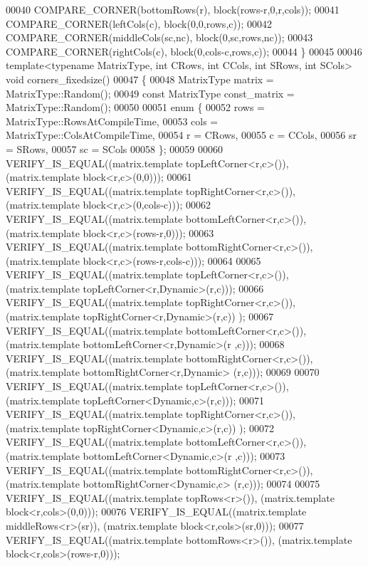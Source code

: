 \begin{DoxyCode}
00040   COMPARE\_CORNER(bottomRows(r), block(rows-r,0,r,cols));
00041   COMPARE\_CORNER(leftCols(c), block(0,0,rows,c));
00042   COMPARE\_CORNER(middleCols(sc,nc), block(0,sc,rows,nc));
00043   COMPARE\_CORNER(rightCols(c), block(0,cols-c,rows,c));
00044 \}
00045 
00046 \textcolor{keyword}{template}<\textcolor{keyword}{typename} MatrixType, \textcolor{keywordtype}{int} CRows, \textcolor{keywordtype}{int} CCols, \textcolor{keywordtype}{int} SRows, \textcolor{keywordtype}{int} SCols> \textcolor{keywordtype}{void} corners\_fixedsize()
00047 \{
00048   MatrixType matrix = MatrixType::Random();
00049   \textcolor{keyword}{const} MatrixType const\_matrix = MatrixType::Random();
00050 
00051   \textcolor{keyword}{enum} \{
00052     rows = MatrixType::RowsAtCompileTime,
00053     cols = MatrixType::ColsAtCompileTime,
00054     r = CRows,
00055     c = CCols,
00056     sr = SRows,
00057     sc = SCols
00058   \};
00059 
00060   VERIFY\_IS\_EQUAL((matrix.template topLeftCorner<r,c>()), (matrix.template block<r,c>(0,0)));
00061   VERIFY\_IS\_EQUAL((matrix.template topRightCorner<r,c>()), (matrix.template block<r,c>(0,cols-c)));
00062   VERIFY\_IS\_EQUAL((matrix.template bottomLeftCorner<r,c>()), (matrix.template block<r,c>(rows-r,0)));
00063   VERIFY\_IS\_EQUAL((matrix.template bottomRightCorner<r,c>()), (matrix.template block<r,c>(rows-r,cols-c)));
00064 
00065   VERIFY\_IS\_EQUAL((matrix.template topLeftCorner<r,c>()), (matrix.template topLeftCorner<r,Dynamic>(r,c)));
00066   VERIFY\_IS\_EQUAL((matrix.template topRightCorner<r,c>()), (matrix.template topRightCorner<r,Dynamic>(r,c))
      );
00067   VERIFY\_IS\_EQUAL((matrix.template bottomLeftCorner<r,c>()), (matrix.template bottomLeftCorner<r,Dynamic>(r
      ,c)));
00068   VERIFY\_IS\_EQUAL((matrix.template bottomRightCorner<r,c>()), (matrix.template bottomRightCorner<r,Dynamic>
      (r,c)));
00069 
00070   VERIFY\_IS\_EQUAL((matrix.template topLeftCorner<r,c>()), (matrix.template topLeftCorner<Dynamic,c>(r,c)));
00071   VERIFY\_IS\_EQUAL((matrix.template topRightCorner<r,c>()), (matrix.template topRightCorner<Dynamic,c>(r,c))
      );
00072   VERIFY\_IS\_EQUAL((matrix.template bottomLeftCorner<r,c>()), (matrix.template bottomLeftCorner<Dynamic,c>(r
      ,c)));
00073   VERIFY\_IS\_EQUAL((matrix.template bottomRightCorner<r,c>()), (matrix.template bottomRightCorner<Dynamic,c>
      (r,c)));
00074 
00075   VERIFY\_IS\_EQUAL((matrix.template topRows<r>()), (matrix.template block<r,cols>(0,0)));
00076   VERIFY\_IS\_EQUAL((matrix.template middleRows<r>(sr)), (matrix.template block<r,cols>(sr,0)));
00077   VERIFY\_IS\_EQUAL((matrix.template bottomRows<r>()), (matrix.template block<r,cols>(rows-r,0)));

\end{DoxyCode}

